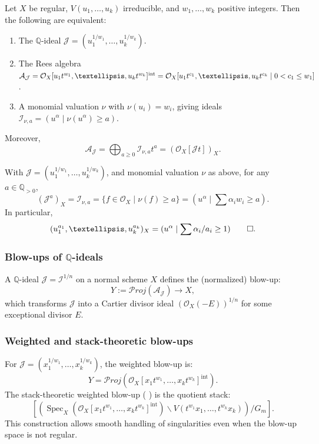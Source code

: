 \documentclass{amsart}
\newcommand{\QQ}{{\mathbb{Q}}}
\newcommand{\cA}{{\mathcal A}}
\newcommand{\cI}{{\mathcal I}}
\newcommand{\cJ}{{\mathcal J}}
\newcommand{\cO}{{\mathcal O}}
\newcommand{\Spec}{\operatorname{Spec}}
\newcommand{\cProj}{{{\mathcal P}roj}}
\renewcommand{\setminus}{\smallsetminus}
\newcommand{\inte}{{\operatorname{int}}}
\begin{document}
\begin{lemma}\label{comp}
Let $X$ be regular, $V(u_1,\ldots,u_k)$ irreducible, and $w_1,\ldots,w_k$ positive integers. Then the following are equivalent:
\begin{enumerate}
\item The $\QQ$-ideal $\cJ = (u_1^{1/w_1},\ldots,u_k^{1/w_k})$.
\item The Rees algebra $\cA_\cJ = \cO_X[u_1 t^{w_1}, \ldots, u_k t^{w_k}]^\inte=\\
\cO_X[u_1t^{c_1},\ldots, u_kt^{c_k} \mid 0< c_1\leq w_1]$.
\item A monomial valuation $\nu$ with $\nu(u_i) = w_i$, giving ideals $\cI_{\nu,a} = (u^\alpha \mid \nu(u^\alpha)\geq a)$.
\end{enumerate}
Moreover, 
\[
\cA_\cJ = \bigoplus_{a \geq 0} \cI_{\nu,a} t^a = (\cO_X[\cJ t])_X.
\]
\end{lemma}

\begin{lemma} \label{comp2-short}\cite{W22}
With $\cJ = (u_1^{1/w_1}, \ldots, u_k^{1/w_k})$, and monomial valuation $\nu$ as above, for any $a \in \QQ_{>0}$,
\[
(\cJ^a)_X = \cI_{\nu,a} = \{f \in \cO_X \mid \nu(f) \geq a\} = (u^\alpha \mid \sum \alpha_i w_i \geq a).
\]
In particular,
\[
(u_1^{a_1},\ldots,u_k^{a_k})_X = (u^\alpha \mid \sum \alpha_i / a_i \geq 1)\qed.
\]
\end{lemma}

\subsubsection{Blow-ups of $\QQ$-ideals}
A $\QQ$-ideal $\cJ = \cI^{1/n}$ on a normal scheme $X$ defines the (normalized) blow-up:
\[
Y := \cProj(\cA_\cJ) \to X,
\]
which transforms $\cJ$ into a Cartier divisor ideal $(\cO_X(-E))^{1/n}$ for some exceptional divisor $E$.

\subsubsection{Weighted and stack-theoretic blow-ups}
For $\cJ = (x_1^{1/w_1},\ldots,x_k^{1/w_k})$, the weighted blow-up is:
\[
Y = \cProj(\cO_X[x_1 t^{w_1}, \ldots, x_k t^{w_k}]^\inte).
\]
The stack-theoretic weighted blow-up (\cite[Section 3.1]{ATW-weighted} ) is the quotient stack:
\[
\left[\left(\Spec_X(\cO_X[x_1 t^{w_1}, \ldots, x_k t^{w_k}]^\inte) \setminus V(t^{w_1} x_1, \ldots, t^{w_k} x_k)\right)/G_m\right].
\]
This construction allows smooth handling of singularities even when the blow-up space is not regular.
\end{document}
